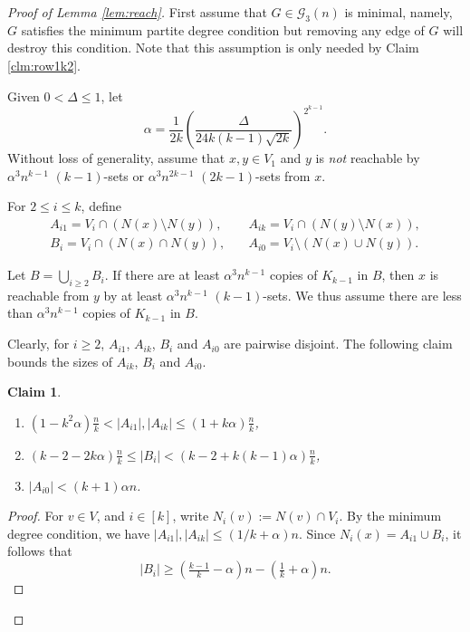 \documentclass[reqno]{amsart}
\theoremstyle{plain}
\newtheorem{claim}[theorem]{Claim}
\def\a{\alpha}
\def\G{\mathcal{G}}
\begin{document}
\begin{proof}
[Proof of Lemma \ref{lem:reach}]
First assume that $G\in \G_3(n)$ is minimal, namely, $G$ satisfies the minimum partite degree condition but removing any edge of $G$ will destroy this condition. Note that this assumption is only needed by Claim \ref {clm:row1k2}.

Given $0< \Delta \le 1$, let
\begin{equation}
\label{eq:ad}
\a = \frac1{2k} \left( \frac{\Delta}{24 k(k-1) \sqrt{2k} } \right)^{2^{k-1}}.
\end{equation}
Without loss of generality, assume that $x, y\in V_1$ and $y$ is \emph{not} reachable by $\alpha^3 n^{k-1}$ $(k-1)$-sets or $\alpha^3 n^{2k-1}$ $(2k-1)$-sets from $x$.

For $2\le i\le k$, define
\begin{align*}
   A_{i1}=V_i\cap (N(x)\setminus N(y)), &   \quad A_{ik}=V_i\cap (N(y)\setminus N(x)),  \\
   B_i=V_i\cap (N(x)\cap N(y)), &    \quad A_{i0}=V_i\setminus (N(x)\cup N(y)).
\end{align*}

Let $B=\bigcup_{i\ge 2} B_i$. If there are at least $\alpha^3 n^{k-1}$ copies of $K_{k-1}$ in $B$, then $x$ is reachable from $y$ by at least $\alpha^3 n^{k-1}$ $(k-1)$-sets. We thus assume there are less than $\alpha^3 n^{k-1}$ copies of $K_{k-1}$ in $B$.

Clearly, for $i\ge 2$, $A_{i1}$, $A_{ik}$, $B_i$ and $A_{i0}$ are pairwise disjoint. The following claim bounds the sizes of $A_{ik}$, $B_i$ and $A_{i0}$.



\begin{claim}
\label{clm:Ai1}
\begin{enumerate}
\item $(1- k^2 \alpha) \frac{n}{k} <|A_{i1}|,|A_{ik}|\le (1 + k\alpha)\frac{n}{k}$,
\item $(k-2 - 2k\alpha)\frac{n}{k} \le|B_i|< \left(k -2 + k(k-1)\alpha \right) \frac{n}{k}$,
\item $|A_{i0}|<(k+1)\alpha n$.
\end{enumerate}
\end{claim}

\begin{proof}
For $v\in V$, and $i\in[k]$, write $N_i(v):=N(v)\cap V_i$.
By the minimum degree condition, we have $|A_{i1}|,|A_{ik}|\le (1/k+\alpha)n$.
Since $N_i(x)=A_{i1}\cup B_i$, it follows that
\begin{equation}
\label{eq:Bi}
|B_i|\ge (\tfrac{k-1}k-\alpha)n-(\tfrac1k+\alpha)n. %
\end{equation}


\end{proof}
\end{proof}
\end{document}

